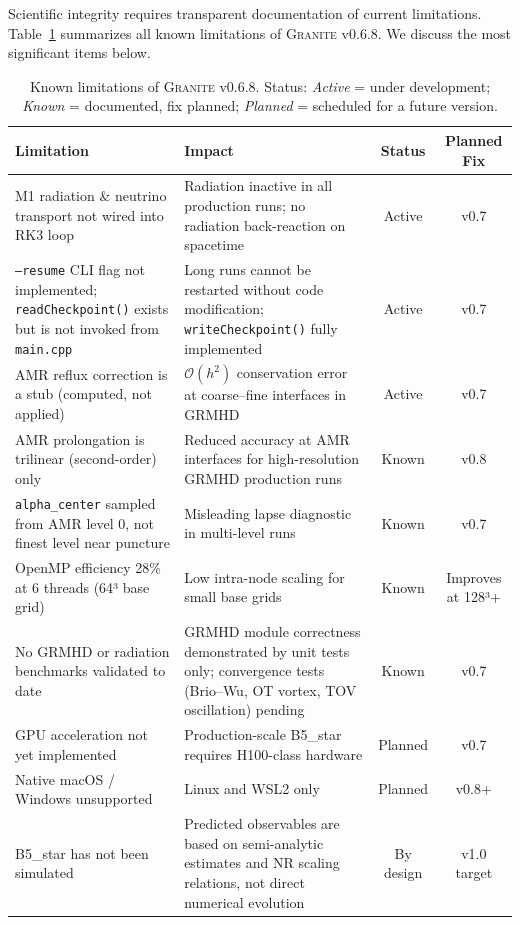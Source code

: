 \documentclass[aps,prd,twocolumn,superscriptaddress,nofootinbib,showpacs,
               longbibliography]{revtex4-2}
\newcommand{\granite}{\textsc{Granite}}
\newcommand{\code}[1]{\texttt{#1}}
\newcommand{\order}[1]{\mathcal{O}(#1)}
\begin{document}
Scientific integrity requires transparent documentation of current limitations.
Table~\ref{tab:limitations} summarizes all known limitations of \granite{}
v0.6.8.
We discuss the most significant items below.

\begin{table}[t]
\caption{Known limitations of \granite{} v0.6.8. Status: \textit{Active} =
  under development; \textit{Known} = documented, fix planned;
  \textit{Planned} = scheduled for a future version.}
\label{tab:limitations}
\begin{ruledtabular}
\begin{tabular}{p{6cm}p{4.5cm}cc}
  Limitation & Impact & Status & Planned Fix \\ \hline
  M1 radiation \& neutrino transport not wired into RK3 loop
    & Radiation inactive in all production runs; no radiation back-reaction on spacetime
    & Active & v0.7 \\[2pt]
  \code{--resume} CLI flag not implemented;
    \code{readCheckpoint()} exists but is not invoked from \code{main.cpp}
    & Long runs cannot be restarted without code modification;
      \code{writeCheckpoint()} fully implemented
    & Active & v0.7 \\[2pt]
  AMR reflux correction is a stub (computed, not applied)
    & $\order{h^2}$ conservation error at coarse--fine interfaces in GRMHD
    & Active & v0.7 \\[2pt]
  AMR prolongation is trilinear (second-order) only
    & Reduced accuracy at AMR interfaces for high-resolution GRMHD production runs
    & Known & v0.8 \\[2pt]
  \code{alpha\_center} sampled from AMR level 0, not finest level near puncture
    & Misleading lapse diagnostic in multi-level runs
    & Known & v0.7 \\[2pt]
  OpenMP efficiency 28\% at 6 threads (64³ base grid)
    & Low intra-node scaling for small base grids
    & Known & Improves at 128³+ \\[2pt]
  No GRMHD or radiation benchmarks validated to date
    & GRMHD module correctness demonstrated by unit tests only;
      convergence tests (Brio--Wu, OT vortex, TOV oscillation) pending
    & Known & v0.7 \\[2pt]
  GPU acceleration not yet implemented
    & Production-scale B5\_star requires H100-class hardware
    & Planned & v0.7 \\[2pt]
  Native macOS / Windows unsupported
    & Linux and WSL2 only
    & Planned & v0.8+ \\[2pt]
  B5\_star has not been simulated
    & Predicted observables are based on semi-analytic estimates
      and NR scaling relations, not direct numerical evolution
    & By design & v1.0 target \\
\end{tabular}
\end{ruledtabular}
\end{table}
\end{document}
